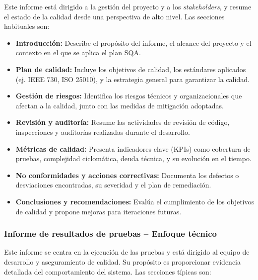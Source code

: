 \documentclass[12pt, letterpaper]{article}
\begin{document}
Este informe está dirigido a la gestión del proyecto y a los \emph{stakeholders}, y resume el estado de la calidad desde una perspectiva de alto nivel. Las secciones habituales son:

\begin{itemize}
    \item \textbf{Introducción:} Describe el propósito del informe, el alcance del proyecto y el contexto en el que se aplica el plan SQA.
    \item \textbf{Plan de calidad:} Incluye los objetivos de calidad, los estándares aplicados (ej. IEEE 730, ISO 25010), y la estrategia general para garantizar la calidad.
    \item \textbf{Gestión de riesgos:} Identifica los riesgos técnicos y organizacionales que afectan a la calidad, junto con las medidas de mitigación adoptadas.
    \item \textbf{Revisión y auditoría:} Resume las actividades de revisión de código, inspecciones y auditorías realizadas durante el desarrollo.
    \item \textbf{Métricas de calidad:} Presenta indicadores clave (KPIs) como cobertura de pruebas, complejidad ciclomática, deuda técnica, y su evolución en el tiempo.
    \item \textbf{No conformidades y acciones correctivas:} Documenta los defectos o desviaciones encontradas, su severidad y el plan de remediación.
    \item \textbf{Conclusiones y recomendaciones:} Evalúa el cumplimiento de los objetivos de calidad y propone mejoras para iteraciones futuras.
\end{itemize}

\subsubsection*{Informe de resultados de pruebas – Enfoque técnico}

Este informe se centra en la ejecución de las pruebas y está dirigido al equipo de desarrollo y aseguramiento de calidad. Su propósito es proporcionar evidencia detallada del comportamiento del sistema. Las secciones típicas son:
\end{document}
